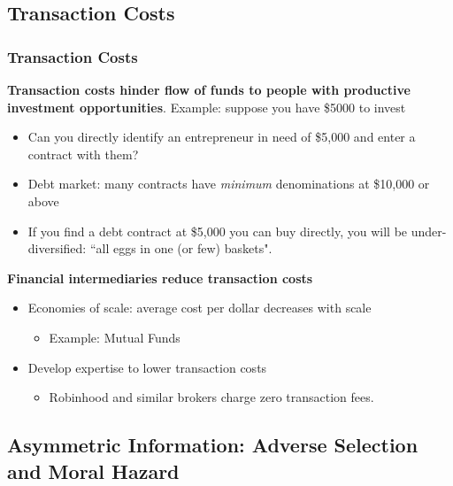\documentclass[aspectratio=169]{beamer}
\begin{document}
\subsection{Transaction Costs}

\begin{frame}
\frametitle{Transaction Costs}


\textbf{Transaction costs hinder flow of funds to people with productive investment opportunities}. Example: suppose you have \$5000 to invest 
\begin{itemize}
        \item Can you directly identify an entrepreneur in need of \$5,000 and enter a contract with them? \pause 
        \item Debt market: many contracts have \emph{minimum} denominations at \$10,000 or above 
        \item If you find a debt contract at \$5,000 you can buy directly, you will be under-diversified: ``all eggs in one (or few) baskets".
\end{itemize}  \pause 


\medskip 

\textbf{Financial intermediaries reduce transaction costs}
\begin{itemize}
    \item Economies of scale: average cost per dollar decreases with scale
    \begin{itemize}
        \item Example: Mutual Funds 
    \end{itemize}
    \item Develop expertise to lower transaction costs
    \begin{itemize}
        \item Robinhood and similar brokers charge zero transaction fees. 
    \end{itemize} 
\end{itemize}




\end{frame}



\subsection{Asymmetric Information: Adverse Selection and Moral Hazard}
\end{document}
